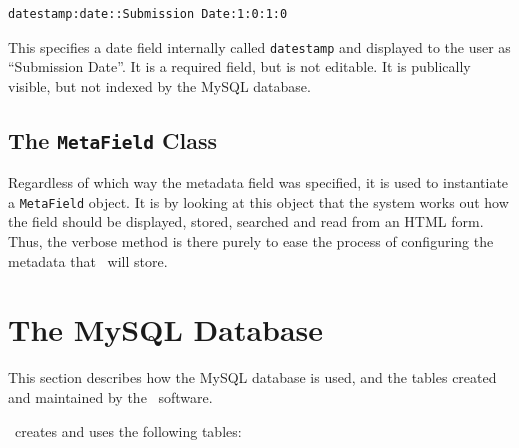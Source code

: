 \begin{verbatim}
datestamp:date::Submission Date:1:0:1:0
\end{verbatim}

This specifies a date field internally called {\tt datestamp} and displayed to the user as ``Submission Date''. It is a required field, but is not editable. It is publically visible, but not indexed by the MySQL database.


\subsection{The {\tt MetaField} Class}

Regardless of which way the metadata field was specified, it is used to instantiate a {\tt MetaField} object. It is by looking at this object that the system works out how the field should be displayed, stored, searched and read from an HTML form. Thus, the verbose method is there purely to ease the process of configuring the metadata that \eprints\ will store.


\section{The MySQL Database}

This section describes how the MySQL database is used, and the tables created and maintained by the \eprints\ software.

\eprints\ creates and uses the following tables:

